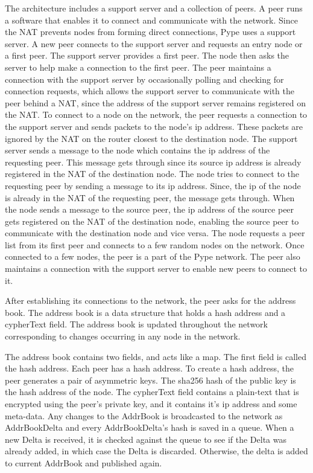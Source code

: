 \documentclass[a4paper,11pt]{article}
\begin{document}
The architecture includes a support server and a collection of peers. A peer runs a software that enables it to connect and communicate with the network. Since the NAT prevents nodes from forming direct connections, Pype uses a support server. A new peer connects to the support server and requests an entry node or a first peer. The support server provides a first peer. The node then asks the server to help make a connection to the first peer. The peer maintains a connection with the support server by occasionally polling and checking for connection requests, which allows the support server to communicate with the peer behind a NAT, since the address of the support server remains registered on the NAT. To connect to a node on the network, the peer requests a connection to the support server and sends packets to the node's ip address. These packets are ignored by the NAT on the router closest to the destination node. The support server sends a message to the node which contains the ip address of the requesting peer. This message gets through since its source ip address is already registered in the NAT of the destination node. The node tries to connect to the requesting peer by sending a message to its ip address. Since, the ip of the node is already in the NAT of the requesting peer, the message gets through. When the node sends a message to the source peer, the ip address of the source peer gets registered on the NAT of the destination node, enabling the source peer to communicate with the destination node and vice versa. The node requests a peer list from its first peer and connects to a few random nodes on the network. Once connected to a few nodes, the peer is a part of the Pype network. The peer also maintains a connection with the support server to enable new peers to connect to it.


After establishing its connections to the network, the peer asks for the address book. The address book is a data structure that holds a hash address and a cypherText field. The address book is updated throughout the network corresponding to changes occurring in any node in the network.




The address book contains two fields, and acts like a map. The first field is called the hash address. Each peer has a hash address. To create a hash address, the peer generates a pair of asymmetric keys. The sha256 hash of the public key is the hash address of the node. The cypherText field contains a plain-text that is encrypted using the peer's private key, and it contains it's ip address and some meta-data. Any changes to the AddrBook is broadcasted to the network as AddrBookDelta and every AddrBookDelta's hash is saved in a queue. When a new Delta is received, it is checked against the queue to see if the Delta was already added, in which case the Delta is discarded. Otherwise, the delta is added to current AddrBook and published again.
\end{document}
